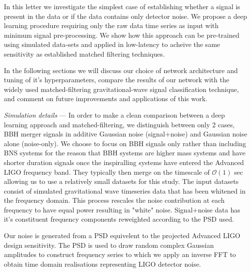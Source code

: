 \documentclass[%
showpacs,
 amsmath,amssymb,
 aps,
 twocolumn,
 prl,
 reprint,
floatfix,
]{revtex4-1}
\begin{document}
%
%
In this letter we investigate the simplest case of establishing whether a
signal is present in the data or if the data contains only detector noise. We
propose a deep learning procedure requiring only the raw data time
series as input with minimum signal pre-processing. We show how this approach
can be pre-trained using simulated data-sets and applied in low-latency 
to acheive the same sensitivity as established matched filtering techniques. 

%
% 
In the following sections we will discuss our choice of network architecture
and tuning of it's hyperparameters, compare the results of our network with the
widely used matched-filtering gravitational-wave signal classification
technique, and comment on future improvements and applications of this work.      

%
%
\textit{Simulation details} --- 
%
%
In order to make a clean comparison between a deep learning approach and
matched-filtering, we distinguish between only 2 cases, \ac{BBH} merger signals
in additive Gaussian noise (signal+noise) and Gaussian noise alone
(noise-only). We choose to focus on \ac{BBH} signals only rather than including
\ac{BNS} systems for the reason that \ac{BBH} systems are higher mass systems
and have shorter duration signals once the inspiralling systems have entered
the Advanced LIGO frequency band. They typically then merge on the timescale of
$\mathcal{O}(1)$ sec allowing us to use a relatively small datasets for this
study. The input datasets consist of simulated gravitational wave timeseries
data that has been whitened in the frequency domain. This process rescales the
noise contribution at each frequency to have equal power resulting in "white"
noise. Signal+noise data has it's constituent frequency components
reweighted according to the \ac{PSD} used.    

%
%
Our noise is generated from a \ac{PSD} equivelent to the projected Advanced
LIGO design sensitivity. The \ac{PSD} is used to draw random complex Gaussian
amplitudes to construct frequency series to which we apply an inverse \ac{FFT}
to obtain time domain realisations representing LIGO detector noise.
\end{document}
